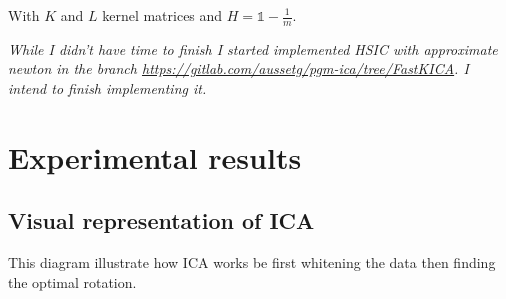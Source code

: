 \documentclass[a4paper,BCOR=5mm,oneside,openany]{scrreprt}
\begin{document}
With $K$ and $L$ kernel matrices and $H = \mathds{1} - \frac{1}{m}$.

\vspace{1cm}

\emph{While I didn't have time to finish I started implemented HSIC with approximate newton in the branch \url{https://gitlab.com/aussetg/pgm-ica/tree/FastKICA}. I intend to finish implementing it.}

\appendix

\chapter{Experimental results}

\section{Visual representation of ICA}

This diagram illustrate how ICA works be first whitening the data then finding the optimal rotation.

\begin{figure}[H]
	\centering
	\hfill
	 \\
	\vfill
	\hfill
\end{figure}
\end{document}
